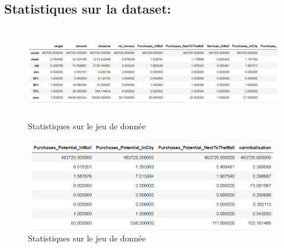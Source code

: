 \subsection{Statistiques sur la dataset:}
\begin{figure}[h]
\begin{center}
\includegraphics[width=15cm,height=4cm]{images/statistics_1.png}
\caption[Statistiques sur le jeu de donnée]{Statistiques sur le jeu de donnée}
\label{monlabel}
\end{center}
\end{figure}

\begin{figure}[h]
\begin{center}
\includegraphics[width=15cm,height=4cm]{images/statistics_2.png}
\caption[Statistiques sur le jeu de donnée]{Statistiques sur le jeu de donnée}
\label{monlabel}
\end{center}
\end{figure}
\newpage

